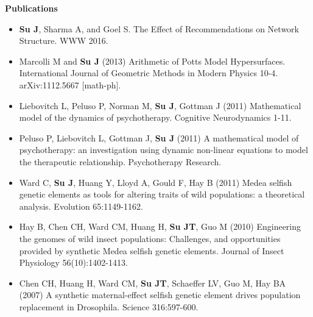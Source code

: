 \documentclass[letterpaper,10pt]{article}
\newcommand{\resheading}[1]{{\large \colorbox{mygrey}{\begin{minipage}{\textwidth}{\textbf{#1 \vphantom{p\^{E}}}}\end{minipage}}}}
\begin{document}
\resheading{Publications}
\begin{itemize}
  \item \textbf{Su J}, Sharma A, and Goel S.  The Effect of Recommendations on Network Structure.  WWW 2016.
	\item Marcolli M and \textbf{Su J} (2013) Arithmetic of Potts Model Hypersurfaces.  International Journal of Geometric Methods in Modern Physics 10-4.  arXiv:1112.5667 [math-ph].
	\item Liebovitch L, Peluso P, Norman M, \textbf{Su J}, Gottman J (2011) Mathematical model of the dynamics of psychotherapy.  Cognitive Neurodynamics 1-11.
	\item Peluso P, Liebovitch L, Gottman J, \textbf{Su J} (2011) A mathematical model of psychotherapy: an investigation using dynamic non-linear equations to model the therapeutic relationship.  Psychotherapy Research.
	\item Ward C, \textbf{Su J}, Huang Y, Lloyd A, Gould F, Hay B (2011) Medea selfish genetic elements as tools for altering traits of wild populations: a theoretical analysis.  Evolution 65:1149-1162.
	\item Hay B, Chen CH, Ward CM, Huang H, \textbf{Su JT}, Guo M (2010) Engineering the genomes of wild insect populations: Challenges, and opportunities provided by synthetic Medea selfish genetic elements.  Journal of Insect Physiology 56(10):1402-1413.
	\item Chen CH, Huang H, Ward CM, \textbf{Su JT}, Schaeffer LV, Guo M, Hay BA (2007) A synthetic maternal-effect selfish genetic element drives population replacement in Drosophila. Science 316:597-600.
\end{itemize}
\end{document}
